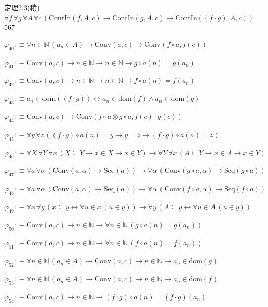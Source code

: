 \begin{fullproof}{定理2.3(積)}{$\forall f\,\forall g\,\forall A\,\forall c\,(\mathrm{ContIn}(f,A,c) \to \mathrm{ContIn}(g,A,c) \to \mathrm{ContIn}((f \cdot g),A,c))$}{567}
\begin{abbrevlist}
\item $\varphi_{40} :\equiv \forall n \in \mathbb{N}\,(a_{n} \in A) \to \mathrm{Conv}(a,c) \to \mathrm{Conv}(f \circ a,f(c))$
\item $\varphi_{41} :\equiv \mathrm{Conv}(a,c) \to n \in \mathbb{N} \to n \in \mathbb{N} \to g \circ a(n) = g(a_{n})$
\item $\varphi_{42} :\equiv \mathrm{Conv}(a,c) \to n \in \mathbb{N} \to n \in \mathbb{N} \to f \circ a(n) = f(a_{n})$
\item $\varphi_{43} :\equiv a_{n} \in \mathrm{dom}((f \cdot g)) \leftrightarrow a_{n} \in \mathrm{dom}(f) \land a_{n} \in \mathrm{dom}(g)$
\item $\varphi_{44} :\equiv \mathrm{Conv}(a,c) \to \mathrm{Conv}(f \circ a \otimes g \circ a,f(c) \cdot g(c))$
\item $\varphi_{45} :\equiv \forall y\,\forall z\,((f \cdot g) \circ a(n) = y \to y = z \to (f \cdot g) \circ a(n) = z)$
\item $\varphi_{46} :\equiv \forall X\,\forall Y\,\forall x\,(X \subseteq Y \to x \in X \to x \in Y) \to \forall Y\,\forall x\,(A \subseteq Y \to x \in A \to x \in Y)$
\item $\varphi_{47} :\equiv \forall a\,\forall \alpha\,(\mathrm{Conv}(a,\alpha) \to \mathrm{Seq}(a)) \to \forall \alpha\,(\mathrm{Conv}(g \circ a,\alpha) \to \mathrm{Seq}(g \circ a))$
\item $\varphi_{48} :\equiv \forall a\,\forall \alpha\,(\mathrm{Conv}(a,\alpha) \to \mathrm{Seq}(a)) \to \forall \alpha\,(\mathrm{Conv}(f \circ a,\alpha) \to \mathrm{Seq}(f \circ a))$
\item $\varphi_{49} :\equiv \forall x\,\forall y\,(x \subseteq y \leftrightarrow \forall u \in x\,(u \in y)) \to \forall y\,(A \subseteq y \leftrightarrow \forall u \in A\,(u \in y))$
\item $\varphi_{50} :\equiv \mathrm{Conv}(a,c) \to n \in \mathbb{N} \to \forall n \in \mathbb{N}\,(g \circ a(n) = g(a_{n}))$
\item $\varphi_{51} :\equiv \mathrm{Conv}(a,c) \to n \in \mathbb{N} \to \forall n \in \mathbb{N}\,(f \circ a(n) = f(a_{n}))$
\item $\varphi_{52} :\equiv \forall n \in \mathbb{N}\,(a_{n} \in A) \to \mathrm{Conv}(a,c) \to n \in \mathbb{N} \to a_{n} \in \mathrm{dom}(g)$
\item $\varphi_{53} :\equiv \forall n \in \mathbb{N}\,(a_{n} \in A) \to \mathrm{Conv}(a,c) \to n \in \mathbb{N} \to a_{n} \in \mathrm{dom}(f)$
\item $\varphi_{54} :\equiv \mathrm{Conv}(a,c) \to n \in \mathbb{N} \to (f \cdot g) \circ a(n) = (f \cdot g)(a_{n})$

\end{abbrevlist}
\end{fullproof}
